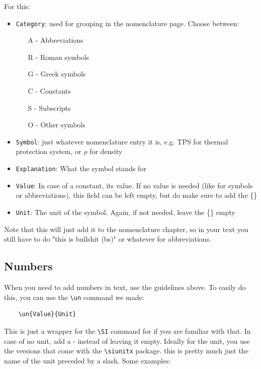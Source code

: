 \documentclass[../main.tex]{subfiles}
\begin{document}
For this:
\begin{itemize}
    \item \texttt{Category}: used for grouping in the nomenclature page. Choose between:
    \begin{itemize}
        \item[A -] Abbreviations
        \item[R -] Roman symbols
        \item[G -] Greek symbols
        \item[C -] Constants
        \item[S -] Subscripts
        \item[O -] Other symbols
    \end{itemize}
    \item \texttt{Symbol}: just whatever nomenclature entry it is, e.g. TPS for thermal protection system, or $\rho$ for density
    \item \texttt{Explanation}: What the symbol stands for
    \item \texttt{Value}: In case of a constant, its value. If no value is needed (like for symbols or abbreviations), this field can be left empty, but do make sure to add the \{\}
    \item \texttt{Unit}: The unit of the symbol. Again, if not needed, leave the \{\} empty
\end{itemize}

Note that this will just add it to the nomenclature chapter, so in your text you still have to do "this is bullshit (bs)" or whatever for abbreviations.

\subsection{Numbers}

When you need to add numbers in text, use the guidelines above. To easily do this, you can use the \texttt{\textbackslash{}un} command we made:

\begin{verbatim}
    \un{Value}{Unit}
\end{verbatim}

This is just a wrapper for the \texttt{\textbackslash{}SI} command for if you are familiar with that. In case of no unit, add a - instead of leaving it empty. Ideally for the unit, you use the versions that come with the \texttt{\textbackslash{}siunitx} package. this is pretty much just the name of the unit preceded by a slash. Some examples:
\end{document}
